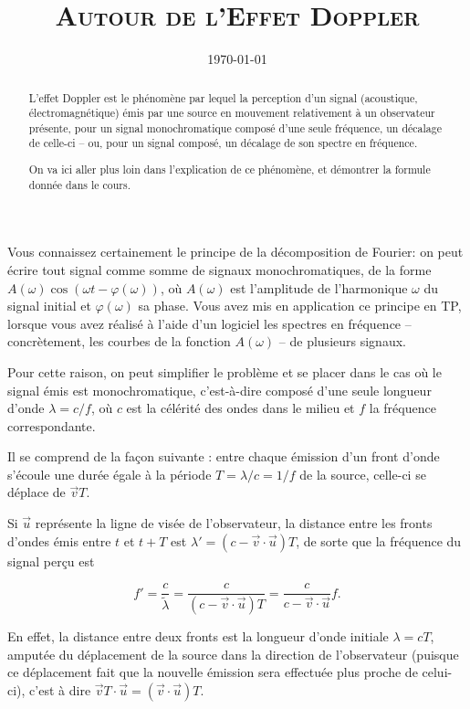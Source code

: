 \documentclass{article}
\title{\textsc{Autour de l'Effet Doppler}}
\author{}
\date{\today}
\renewcommand\phi\varphi
\begin{document}
\maketitle

\begin{abstract}
	L'effet Doppler est le phénomène par lequel la perception d'un signal (acoustique, électromagnétique) émis par une source en mouvement relativement à un observateur présente, pour un signal monochromatique composé d'une seule fréquence, un décalage de celle-ci -- ou, pour un signal composé, un décalage de son spectre en fréquence.
	
	On va ici aller plus loin dans l'explication de ce phénomène, et démontrer la formule donnée dans le cours.
\end{abstract}

Vous connaissez certainement le principe de la décomposition de Fourier: on peut écrire tout signal comme somme de signaux monochromatiques, de la forme $A(\omega)\cos(\omega t - \phi(\omega))$, où $A(\omega)$ est l'amplitude de l'harmonique $\omega$ du signal initial et $\phi(\omega)$ sa phase. Vous avez mis en application ce principe en TP, lorsque vous avez réalisé à l'aide d'un logiciel les spectres en fréquence -- concrètement, les courbes de la fonction $A(\omega)$ -- de plusieurs signaux.

Pour cette raison, on peut simplifier le problème et se placer dans le cas où le signal émis est monochromatique, c'est-à-dire composé d'une seule longueur d'onde $\lambda = c/f$, où $c$ est la célérité des ondes dans le milieu et $f$ la fréquence correspondante.

Il se comprend de la façon suivante : entre chaque émission d'un front d'onde s'écoule une durée égale à la période $T=\lambda/c=1/f$ de la source, celle-ci se déplace de $\vec v T$.

\begin{center}
\end{center}

Si $\vec u$ représente la ligne de visée de l'observateur, la distance entre les fronts d'ondes émis entre $t$ et $t+T$ est $\lambda' = (c-\vec v\cdot\vec u)T$, de sorte que la fréquence du signal perçu est

\[
f' = \frac{c}{\tilde{\lambda}} = \frac{c}{(c-\vec v \cdot \vec u)T} = \frac{c}{c-\vec v\cdot\vec u}f.
\]

En effet, la distance entre deux fronts est la longueur d'onde initiale $\lambda = cT$, amputée du déplacement de la source dans la direction de l'observateur (puisque ce déplacement fait que la nouvelle émission sera effectuée plus proche de celui-ci), c'est à dire $\vec v T \cdot \vec u = (\vec v \cdot \vec u)T$.
\end{document}
